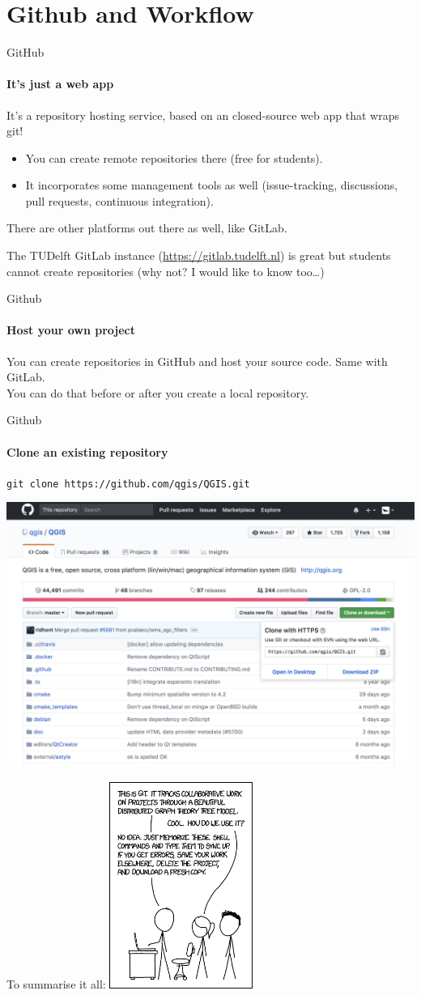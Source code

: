 \documentclass[aspectratio=169]{beamer}
\begin{document}
\section{Github and Workflow}

\begin{frame}{GitHub}
\framesubtitle{It's just a web app}
It's a repository hosting service, based on an closed-source web app that wraps git!

\begin{itemize}
	\item You can create remote repositories there (free for students).
	\item It incorporates some management tools as well (issue-tracking, discussions, pull requests, continuous integration).
\end{itemize}

There are other platforms out there as well, like GitLab.

The TUDelft GitLab instance (\url{https://gitlab.tudelft.nl}) is great but students cannot create repositories (why not? I would like to know too\ldots)
\end{frame}

\begin{frame}{Github}
\framesubtitle{Host your own project}
You can create repositories in GitHub and host your source code. Same with GitLab.
\\
You can do that before or after you create a local repository.
\end{frame}

\begin{frame}{Github}
\framesubtitle{Clone an existing repository}
\alert{\texttt{git clone https://github.com/qgis/QGIS.git}}

\includegraphics[width=\textwidth]{resources/github.png}
\end{frame}

\begin{frame}{To summarise it all:}
\includegraphics[width=0.35\textwidth]{resources/xkcd.png}
\end{frame}
    
\end{document}
